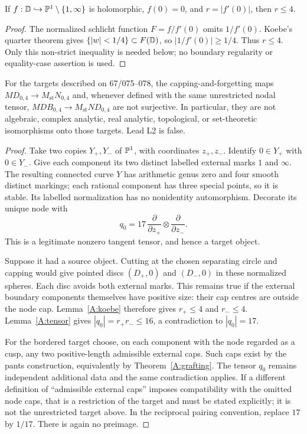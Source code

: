 \begin{lemma}\label{A:koebe}
If $f:{\mathbb{D}}\hookrightarrow{\mathbb{P}}^1\setminus\{1,\infty\}$ is holomorphic,
$f(0)=0$, and $r=|f'(0)|$, then $r\leq4$.
\end{lemma}
\begin{proof}
The normalized schlicht function $F=f/f'(0)$ omits $1/f'(0)$. Koebe's
quarter theorem \citep[Appendix, pp.~10--13]{C_Siu2005} gives $\{|w|<1/4\}\subset F({\mathbb{D}})$, so
$|1/f'(0)|\geq1/4$. Thus $r\leq4$. Only this non-strict inequality is
needed below; no boundary regularity or equality-case assertion is used.
\end{proof}

\begin{theorem}\label{A:04}
For the targets described on 67/075--078, the capping-and-forgetting maps
$MD_{0,4}\to M_{\mathrm{st}}N_{0,4}$ and, whenever defined with the same
unrestricted nodal tensor, $MDB_{0,4}\to M_{\mathrm{st}}ND_{0,4}$ are not
surjective. In particular, they are not algebraic, complex analytic,
real analytic, topological, or set-theoretic isomorphisms onto those targets.
Lead L2 is false.
\end{theorem}
\begin{proof}
Take two copies $Y_+,Y_-$ of ${\mathbb{P}}^1$, with coordinates $z_+,z_-$. Identify
$0\in Y_+$ with $0\in Y_-$. Give each component its two distinct labelled
external marks $1$ and $\infty$. The resulting connected curve $Y$ has
arithmetic genus zero and four smooth distinct markings; each rational
component has three special points, so it is stable. Its labelled
normalization has no nonidentity automorphism. Decorate its unique node with
\[
 q_0=17\,\frac{\partial}{\partial z_+}\otimes
             \frac{\partial}{\partial z_-}.
\]
This is a legitimate nonzero tangent tensor, and hence a target object.

Suppose it had a source object. Cutting at the chosen separating circle
and capping would give pointed discs $(D_+,0)$ and $(D_-,0)$ in these
normalized spheres. Each disc avoids both external marks. This remains
true if the external boundary components themselves have positive size:
their cap centres are outside the node cap. Lemma~\ref{A:koebe} therefore
gives $r_+\leq4$ and $r_-\leq4$. Lemma~\ref{A:tensor} gives
$|q_0|=r_+r_-\leq16$, a contradiction to $|q_0|=17$.

For the bordered target choose, on each component with the node regarded
as a cusp, any two positive-length admissible external caps. Such caps
exist by the pants construction, equivalently by
Theorem~\ref{A:grafting}. The tensor $q_0$ remains independent additional
data and the same contradiction applies. If a different definition of
``admissible external caps'' imposes compatibility with the omitted node
caps, that is a restriction of the target and must be stated explicitly;
it is not the unrestricted target above. In the reciprocal pairing
convention, replace $17$ by $1/17$. There is again no preimage.
\end{proof}

